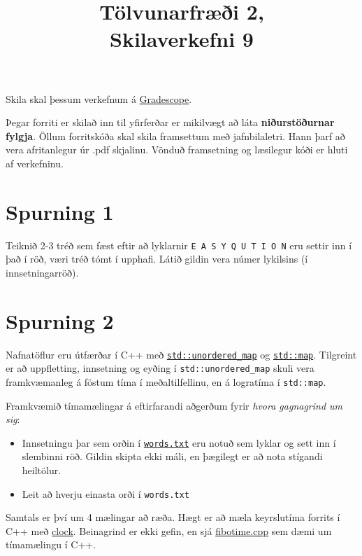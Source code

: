 \documentclass{article}
\title{Tölvunarfræði 2, \semester \\ Skilaverkefni 9}
\author{}
\begin{document}
\maketitle
{}

Skila skal þessum verkefnum á \href{https://gradescope.com/courses/14122}{Gradescope}.

Þegar forriti er skilað inn til yfirferðar er mikilvægt að láta \textbf{niðurstöðurnar fylgja}. Öllum forritskóða skal skila framsettum með jafnbilaletri. Hann þarf að vera afritanlegur úr .pdf skjalinu. Vönduð framsetning og læsilegur kóði er hluti af verkefninu.

\section{Spurning 1}
Teiknið 2-3 tréð sem fæst eftir að lyklarnir \texttt{E A S Y Q U T I O N} eru settir inn í það í röð, væri tréð tómt í upphafi. Látið gildin vera númer lykilsins (í innsetningarröð).

\section{Spurning 2}
Nafnatöflur eru útfærðar í C++ með \href{http://www.cplusplus.com/reference/unordered_map/unordered_map/}{\texttt{std::unordered\_map}} og \href{http://www.cplusplus.com/reference/map/map/}{\texttt{std::map}}. Tilgreint er að uppfletting, innsetning og eyðing í \texttt{std::unordered\_map} skuli vera framkvæmanleg á föstum tíma í meðaltilfellinu, en á logratíma í \texttt{std::map}.

Framkvæmið tímamælingar á eftirfarandi aðgerðum fyrir \emph{hvora gagnagrind um sig}:

\begin{itemize}
 \item Innsetningu þar sem orðin í \href{http://introcs.cs.princeton.edu/java/data/words.txt}{\texttt{words.txt}} eru notuð sem lyklar og sett inn í slembinni röð. Gildin skipta ekki máli, en þægilegt er að nota stígandi heiltölur.
 \item Leit að hverju einasta orði í \texttt{words.txt}
\end{itemize}
Samtals er því um 4 mælingar að ræða. Hægt er að mæla keyrslutíma forrits í C++ með \href{http://www.cplusplus.com/reference/ctime/clock/}{clock}. Beinagrind er ekki gefin, en sjá \href{https://raw.githubusercontent.com/Ernir/kennsluefni/master/T2/Code/w10/fibotime.cpp}{fibotime.cpp} sem dæmi um tímamælingu í C++.
\end{document}
